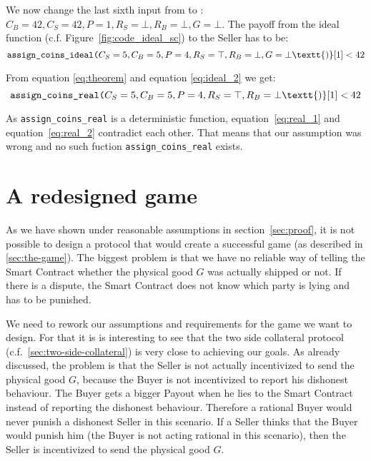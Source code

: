 \documentclass{cacthesis}
\begin{document}
We now change the last sixth input from \top to \bot: $C_B=42,C_S=42,P=1,R_S=\bot,R_B=\bot,G=\bot$. The payoff from the ideal function (c.f. Figure~\ref{fig:code_ideal_sc}) to the Seller has to be:
\begin{equation}
\label{eq:ideal_2}
    \texttt{assign\_coins\_ideal(}C_S=5,C_B=5,P=4, R_S=\top,R_B=\bot,G=\bot\textt{)}[1] <  42
\end{equation}

From equation \ref{eq:theorem} and equation \ref{eq:ideal_2} we get:
\begin{equation}
\label{eq:real_2}
    \texttt{assign\_coins\_real(}C_S=5,C_B=5,P=4,R_S=\top,R_B=\bot\textt{)}[1] <  42
\end{equation}

As \texttt{assign\_coins\_real} is a deterministic function, equation~\ref{eq:real_1} and equation~\ref{eq:real_2} contradict each other. That means that our assumption was wrong and no such fuction  \texttt{assign\_coins\_real} exists.



\chapter{A redesigned game}
\label{cha:redisigned-game}

As we have shown under reasonable assumptions in section~\ref{sec:proof}, it is not possible to design a protocol that would create a successful game (as described in \ref{sec:the-game}). The biggest problem is that we have no reliable way of telling the Smart Contract whether the physical good $G$ was actually shipped or not. If there is a dispute, the Smart Contract does not know which party is lying and has to be punished.\newline

We need to rework our assumptions and requirements for the game we want to design. For that it is is interesting to see that the two side collateral protocol (c.f.~\ref{sec:two-side-collateral}) is very close to achieving our goals. As already discussed, the problem is that the Seller is not actually incentivized to send the physical good $G$, because the Buyer is not incentivized to report his dishonest behaviour. The Buyer gets a bigger Payout when he lies to the Smart Contract instead of reporting the dishonest behaviour. Therefore a rational Buyer would never punish a dishonest Seller in this scenario. If a Seller thinks that the Buyer would punish him (the Buyer is not acting rational in this scenario), then the Seller is incentivized to send the physical good $G$.\newline
\end{document}
